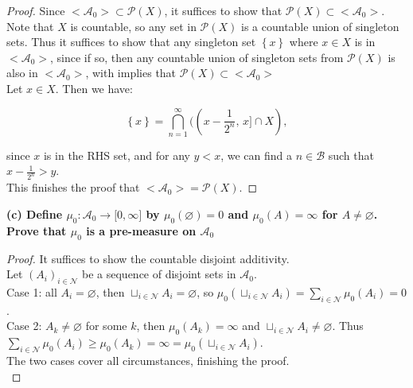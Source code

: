 \documentclass{qlnotes-export}
\begin{document}
\begin{proof}

Since \(< \mathcal{A}_{0} > \subset \mathcal{P}(X)\), it suffices to show that \(\mathcal{P}(X) \subset < \mathcal{A}_{0} >\). Note that \(X\) is countable, so any set in \(\mathcal{P}(X)\) is a countable union of singleton sets. Thus it suffices to show that any singleton set \(\left\{ x \right\}\) where \(x \in X\) is in \(< \mathcal{A}_{0} >\), since if so, then any countable union of singleton sets from \(\mathcal{P}(X)\) is also in \(< \mathcal{A}_{0} >\), with implies that \(\mathcal{P}(X) \subset < \mathcal{A}_{0} >\)\\
Let \(x \in X\). Then we have:

\[\left\{ x \right\} = \bigcap\limits_{n = 1}^{\infty}((x - \frac{1}{2^{n}},\, x\rbrack \cap X),\]

since \(x\) is in the RHS set, and for any \(y < x\), we can find a \(n \in \mathcal{B}\) such that \(x - \frac{1}{2^{n}} > y\).\\
This finishes the proof that \(< \mathcal{A}_{0} > = \mathcal{P}(X)\).

\end{proof}

\textbf{(c) Define \(\mu_{0}:\mathcal{A}_{0}\rightarrow\lbrack 0,\infty\rbrack\) by \(\mu_{0}(\varnothing) = 0\) and \(\mu_{0}(A) = \infty\) for \(A \neq \varnothing\). Prove that \(\mu_{0}\) is a pre-measure on \(\mathcal{A}_{0}\)}

\begin{proof}

It suffices to show the countable disjoint additivity.\\
Let \((A_{i})_{i \in \mathcal{N}}\) be a sequence of disjoint sets in \(\mathcal{A}_{0}\).\\
Case 1: all \(A_{i} = \varnothing\), then \(\sqcup_{i \in \mathcal{N}}A_{i} = \varnothing\), so \(\mu_{0}( \sqcup_{i \in \mathcal{N}}A_{i}) = \sum_{i \in \mathcal{N}}\mu_{0}(A_{i}) = 0\).\\
Case 2: \(A_{k} \neq \varnothing\) for some \(k\), then \(\mu_{0}(A_{k}) = \infty\) and \(\sqcup_{i \in \mathcal{N}}A_{i} \neq \varnothing\). Thus \(\sum_{i \in \mathcal{N}}\mu_{0}(A_{i}) \geq \mu_{0}(A_{k}) = \infty = \mu_{0}( \sqcup_{i \in \mathcal{N}}A_{i})\).\\
The two cases cover all circumstances, finishing the proof.\\

\end{proof}
\end{document}
